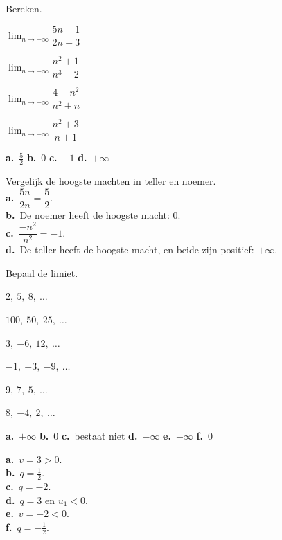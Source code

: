 \begin{oefeningen}
\begin{oefening}[1]\label{oef:h4-ratio}
Bereken.
\begin{reeks}[2]
  \item $\displaystyle\lim_{n\to+\infty} \dfrac{5n - 1}{2n + 3}$
  \item $\displaystyle\lim_{n\to+\infty} \dfrac{n^2 + 1}{n^3 - 2}$
  \item $\displaystyle\lim_{n\to+\infty} \dfrac{4 - n^2}{n^2 + n}$
  \item $\displaystyle\lim_{n\to+\infty} \dfrac{n^2 + 3}{n + 1}$
\end{reeks}
\begin{solution}
\textbf{a.}~$\tfrac52$ \quad \textbf{b.}~0 \quad \textbf{c.}~$-1$ \quad \textbf{d.}~$+\infty$
\end{solution}
\begin{fullsolution}
Vergelijk de hoogste machten in teller en noemer.\\
\textbf{a.}~$\dfrac{5n}{2n}=\dfrac52$.\\
\textbf{b.}~De noemer heeft de hoogste macht: 0.\\
\textbf{c.}~$\dfrac{-n^2}{n^2}=-1$.\\
\textbf{d.}~De teller heeft de hoogste macht, en beide zijn positief: $+\infty$.
\end{fullsolution}
\end{oefening}

\begin{oefening}[1]\label{oef:h4-rrmr}
Bepaal de limiet.
\begin{reeks}
  \item $2,\ 5,\ 8,\ \ldots$
  \item $100,\ 50,\ 25,\ \ldots$
  \item $3,\ {-6},\ 12,\ \ldots$
  \item $-1,\ {-3},\ {-9},\ \ldots$
  \item $9,\ 7,\ 5,\ \ldots$
  \item $8,\ {-4},\ 2,\ \ldots$
\end{reeks}
\begin{solution}
\textbf{a.}~$+\infty$ \quad \textbf{b.}~0 \quad \textbf{c.}~bestaat niet \quad \textbf{d.}~$-\infty$ \quad \textbf{e.}~$-\infty$ \quad \textbf{f.}~0
\end{solution}
\begin{fullsolution}
\textbf{a.}~$v=3>0$.\\
\textbf{b.}~$q=\tfrac12$.\\
\textbf{c.}~$q=-2$.\\
\textbf{d.}~$q=3$ en $u_1<0$.\\
\textbf{e.}~$v=-2<0$.\\
\textbf{f.}~$q=-\tfrac12$.
\end{fullsolution}
\end{oefening}


\end{oefeningen}
